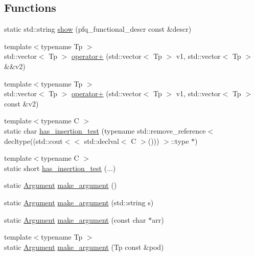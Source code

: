 \subsection*{Functions}
\begin{DoxyCompactItemize}
\item 
static std\+::string \hyperlink{namespacepfq_1_1lang_aaf4ac849c61e156a5be17b618b9eb3bc}{show} (pfq\+\_\+functional\+\_\+descr const \&descr)
\item 
{\footnotesize template$<$typename Tp $>$ }\\std\+::vector$<$ Tp $>$ \hyperlink{namespacepfq_1_1lang_a54f9b99ed2adf6dc2e74d21a38be3bf3}{operator+} (std\+::vector$<$ Tp $>$ v1, std\+::vector$<$ Tp $>$ \&\&v2)
\item 
{\footnotesize template$<$typename Tp $>$ }\\std\+::vector$<$ Tp $>$ \hyperlink{namespacepfq_1_1lang_ae66ee716bfcd7329fbf24620066e48e0}{operator+} (std\+::vector$<$ Tp $>$ v1, std\+::vector$<$ Tp $>$ const \&v2)
\item 
{\footnotesize template$<$typename C $>$ }\\static char \hyperlink{namespacepfq_1_1lang_aa17006c974b74619f845353f18646f1a}{has\+\_\+insertion\+\_\+test} (typename std\+::remove\+\_\+reference$<$ decltype((std\+::cout$<$$<$ std\+::declval$<$ C $>$())) $>$\+::type $\ast$)
\item 
{\footnotesize template$<$typename C $>$ }\\static short \hyperlink{namespacepfq_1_1lang_ad0cb2b1dba5436f8bdf5500f7eaf114c}{has\+\_\+insertion\+\_\+test} (...)
\item 
static \hyperlink{structpfq_1_1lang_1_1Argument}{Argument} \hyperlink{namespacepfq_1_1lang_a7f8ab6d31efcb32e736e5655745fa07c}{make\+\_\+argument} ()
\item 
static \hyperlink{structpfq_1_1lang_1_1Argument}{Argument} \hyperlink{namespacepfq_1_1lang_ac67ba9000c18dc8ea7d065ee7ff57331}{make\+\_\+argument} (std\+::string s)
\item 
static \hyperlink{structpfq_1_1lang_1_1Argument}{Argument} \hyperlink{namespacepfq_1_1lang_a0d4fa0e6d432e19c5780707dbd248304}{make\+\_\+argument} (const char $\ast$arr)
\item 
{\footnotesize template$<$typename Tp $>$ }\\static \hyperlink{structpfq_1_1lang_1_1Argument}{Argument} \hyperlink{namespacepfq_1_1lang_ac8f57f13608b2809f1590509fe76d3c3}{make\+\_\+argument} (Tp const \&pod)
\item 
$$
\end{DoxyCompactItemize}
